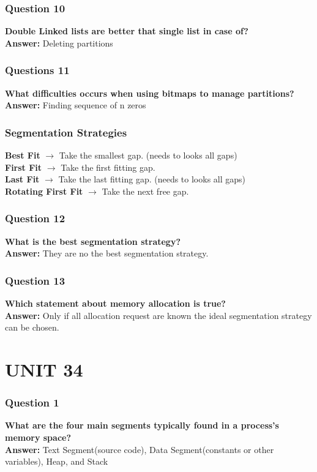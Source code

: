 \documentclass{article}
\begin{document}
\subsubsection*{Question 10}
\textbf{Double Linked lists are better that single list in case of?} \\
\textbf{Answer:} Deleting partitions

\subsubsection*{Questions 11} 
\textbf{What difficulties occurs when using bitmaps to manage partitions?} \\
\textbf{Answer:} Finding sequence of n zeros

\subsubsection*{Segmentation Strategies}
\textbf{Best Fit} $\rightarrow$ Take the smallest gap. (needs to looks all gaps) \\
\textbf{First Fit} $\rightarrow$ Take the first fitting gap. \\
\textbf{Last Fit} $\rightarrow$ Take the last fitting gap. (needs to looks all gaps) \\
\textbf{Rotating First Fit} $\rightarrow$ Take the next free gap.

\subsubsection*{Question 12}
\textbf{What is the best segmentation strategy?} \\
\textbf{Answer:} They are no the best segmentation strategy.

\subsubsection*{Question 13}
\textbf{Which statement about memory allocation is true?} \\
\textbf{Answer:} Only if all allocation request are known the ideal segmentation strategy can be chosen.

\section*{UNIT 34}

\subsubsection*{Question 1}
\textbf{What are the four main segments typically found in a process's memory space?} \\
\textbf{Answer:} Text Segment(source code), Data Segment(constants or other variables), Heap, and Stack
\end{document}
